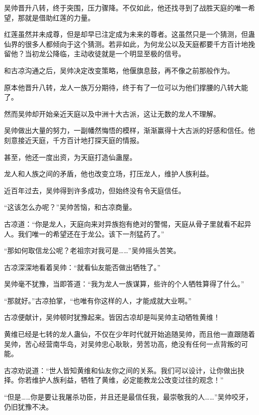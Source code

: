 
\begin{this_body}



吴帅晋升八转，终于突围，压力骤降。不仅如此，他还找寻到了战胜天庭的唯一希望，那就是借助红莲的力量。

红莲虽然并未成尊，但是却早已注定成为未来的尊者。这虽然只是一个猜测，但蛊仙界的很多人都倾向于这个猜测。若非如此，为何龙公以及天庭都要千方百计地挽留他？当初龙公降临，主动收徒就是一个明显至极的信号。

和古凉沟通之后，吴帅决定改变策略，他偃旗息鼓，再不像之前那般作为。

原本他晋升八转，龙人一族万分期待，终于有了一位可以为他们撑腰的八转大能了。

然而吴帅却开始亲近天庭以及中洲十大古派，这让无数的龙人不理解。

吴帅做出大量的努力，一副幡然悔悟的模样，渐渐赢得十大古派的好感和信任。他刻意接近天庭，千方百计地打探天庭的情报。

甚至，他还一度出资，为天庭打造仙蛊屋。

龙人和人族之间的矛盾，他也改变立场，打压龙人，维护人族利益。

近百年过去，吴帅得到许多成功，但始终没有令天庭信任。

“这该怎么办呢？”吴帅苦恼，和古凉商量。

古凉道：“你是龙人，天庭向来对异族抱有绝对的警惕，天庭从骨子里就看不起异人。我们唯一的希望还在于龙公。该下一剂猛药了。”

“那如何取信龙公呢？老祖宗对我可是……”吴帅摇头苦笑。

古凉深深地看着吴帅：“就看仙友能否做出牺牲了。”

吴帅毫不犹豫，当即答道：“我为龙人一族谋算，些许的个人牺牲算得了什么。”

“那就好。”古凉拍掌，“也唯有你这样的人，才能成就大业啊。”

古凉便献计，吴帅顿时犹豫起来。皆因古凉却是叫吴帅主动牺牲黄维！

黄维已经是七转的龙人蛊仙，不仅在少年时代就开始追随吴帅，而且他一直跟随着吴帅，苦心经营南华岛，对吴帅忠心耿耿，劳苦功高，绝没有任何一点背叛的可能。

古凉劝说道：“世人皆知黄维和仙友你之间的关系。我们可以设计，让你做出抉择。你若维护人族利益，牺牲了黄维，必定能教龙公改变过往的观念！”

“但是……你是要让我屠杀功臣，并且还是最信任我，最崇敬我的人……”吴帅咬牙，仍旧犹豫不决。


\end{this_body}
